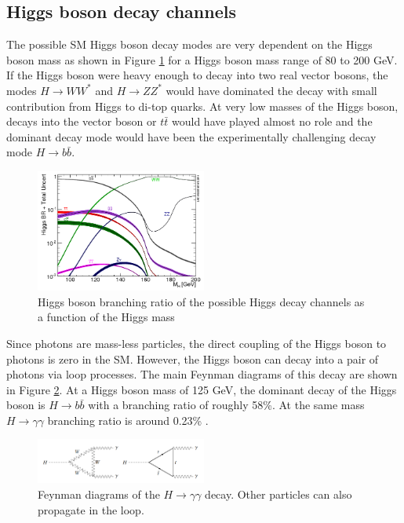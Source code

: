 \subsection{Higgs boson decay channels}
\label{chap1:EWSB:HD}
The possible SM Higgs boson decay modes are very dependent on the Higgs boson mass as shown in Figure \ref{fig:chap1:EWSB:BR} for a Higgs boson mass range of 80 to 200 GeV. If the Higgs boson were heavy enough to decay into two real vector bosons, the modes $H\rightarrow WW^*$ and $ H\rightarrow ZZ^*$ would have dominated the decay with small contribution from Higgs to di-top quarks. At very low masses of the Higgs boson, decays into the vector boson or $t\bar{t}$ would have played almost no role and the dominant decay mode would have been the experimentally challenging decay mode $H\rightarrow b\bar{b}$.
\begin{figure}[htbp]
    \centering
    \includegraphics[width=0.5\textwidth]{Ch1/Img/Higgs_Br.png}
    \caption{Higgs boson branching ratio of the possible Higgs decay channels as a function of the Higgs mass \cite{HiggsBR}}
    \label{fig:chap1:EWSB:BR}
\end{figure}
Since photons are mass-less particles, the direct coupling of the Higgs boson to photons is zero in the SM. However, the Higgs boson can decay into a pair of photons via loop processes. The main Feynman diagrams of this decay are shown in Figure \ref{fig:chap1:EWSB:Hgg}. 
At a Higgs boson mass of 125 GeV, the dominant decay of the Higgs boson is $H \rightarrow b\bar{b}$ with a branching ratio of roughly 58\%. At the same mass $H\rightarrow\gamma\gamma$ branching ratio is around 0.23\% \cite{HXSWG}.
\begin{figure}[htbp]
    \centering
    \includegraphics[width=0.5\textwidth]{Ch1/Img/H_to_gammagamma.png}
    \caption{Feynman diagrams of the $H\rightarrow\gamma\gamma$ decay. Other particles can also propagate in the loop.}
    \label{fig:chap1:EWSB:Hgg}
\end{figure}

